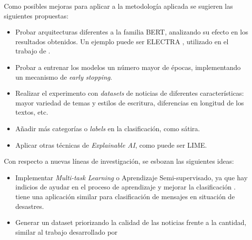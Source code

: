 Como posibles mejoras para aplicar a la metodología aplicada se sugieren las siguientes propuestas:
\begin{itemize}
    \item Probar arquitecturas diferentes a la familia BERT, analizando su efecto en los resultados obtenidos. Un ejemplo puede ser ELECTRA \citep{Clark2020}, utilizado en el trabajo de \citet{Wang2021}.
    \item Probar a entrenar los modelos un número mayor de épocas, implementando un mecanismo de \textit{early stopping}.
    \item Realizar el experimento con \textit{datasets} de noticias de diferentes características: mayor variedad de temas y estilos de escritura, diferencias en longitud de los textos, etc.
    \item Añadir más categorías o \textit{labels} en la clasificación, como sátira.
    \item Aplicar otras técnicas de \textit{Explainable AI}, como puede ser LIME.
\end{itemize}

Con respecto a nuevas líneas de investigación, se esbozan las siguientes ideas:
\begin{itemize}
    \item Implementar \textit{Multi-task Learning} o Aprendizaje Semi-supervisado, ya que hay indicios de ayudar en el proceso de aprendizaje y mejorar la clasificación \citep{Rei2017}. \citet{Wang2021} tiene una aplicación similar para clasificación de mensajes en situación de desastres.
    \item Generar un dataset priorizando la calidad de las noticias frente a la cantidad, similar al trabajo desarrollado por \citet{Gunasekar2023}
\end{itemize}